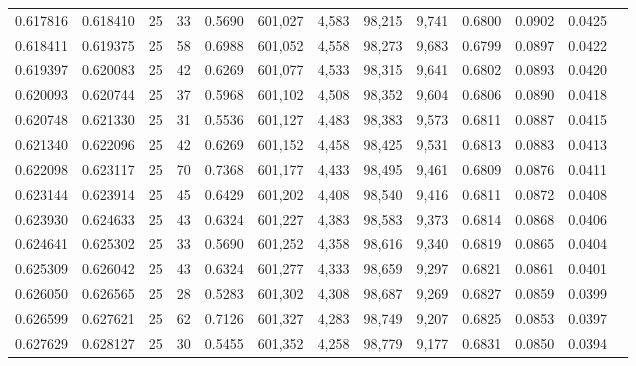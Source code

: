 \begin{tabular}{rrrrrrrrrrrrr}
0.617816 & 0.618410 &    25 &  33 &                                     0.5690 & 601,027 &   4,583 &  98,215 &   9,741 & 0.6800 & 0.0902 & 0.0425 \\
0.618411 & 0.619375 &    25 &  58 &                                     0.6988 & 601,052 &   4,558 &  98,273 &   9,683 & 0.6799 & 0.0897 & 0.0422 \\
0.619397 & 0.620083 &    25 &  42 &                                     0.6269 & 601,077 &   4,533 &  98,315 &   9,641 & 0.6802 & 0.0893 & 0.0420 \\
0.620093 & 0.620744 &    25 &  37 &                                     0.5968 & 601,102 &   4,508 &  98,352 &   9,604 & 0.6806 & 0.0890 & 0.0418 \\
0.620748 & 0.621330 &    25 &  31 &                                     0.5536 & 601,127 &   4,483 &  98,383 &   9,573 & 0.6811 & 0.0887 & 0.0415 \\
0.621340 & 0.622096 &    25 &  42 &                                     0.6269 & 601,152 &   4,458 &  98,425 &   9,531 & 0.6813 & 0.0883 & 0.0413 \\
0.622098 & 0.623117 &    25 &  70 &                                     0.7368 & 601,177 &   4,433 &  98,495 &   9,461 & 0.6809 & 0.0876 & 0.0411 \\
0.623144 & 0.623914 &    25 &  45 &                                     0.6429 & 601,202 &   4,408 &  98,540 &   9,416 & 0.6811 & 0.0872 & 0.0408 \\
0.623930 & 0.624633 &    25 &  43 &                                     0.6324 & 601,227 &   4,383 &  98,583 &   9,373 & 0.6814 & 0.0868 & 0.0406 \\
0.624641 & 0.625302 &    25 &  33 &                                     0.5690 & 601,252 &   4,358 &  98,616 &   9,340 & 0.6819 & 0.0865 & 0.0404 \\
0.625309 & 0.626042 &    25 &  43 &                                     0.6324 & 601,277 &   4,333 &  98,659 &   9,297 & 0.6821 & 0.0861 & 0.0401 \\
0.626050 & 0.626565 &    25 &  28 &                                     0.5283 & 601,302 &   4,308 &  98,687 &   9,269 & 0.6827 & 0.0859 & 0.0399 \\
0.626599 & 0.627621 &    25 &  62 &                                     0.7126 & 601,327 &   4,283 &  98,749 &   9,207 & 0.6825 & 0.0853 & 0.0397 \\
0.627629 & 0.628127 &    25 &  30 &                                     0.5455 & 601,352 &   4,258 &  98,779 &   9,177 & 0.6831 & 0.0850 & 0.0394 \\

\end{tabular}
